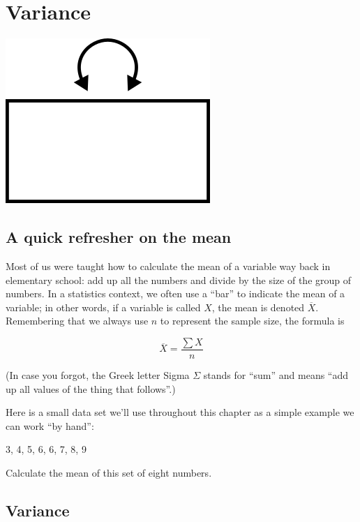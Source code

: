 \documentclass[
]{book}
\begin{document}
\hypertarget{variance}{%
\chapter{Variance}\label{variance}}

\begin{center}\includegraphics{graphics/variance} \end{center}

\hypertarget{variance-mean}{%
\section{A quick refresher on the mean}\label{variance-mean}}

Most of us were taught how to calculate the mean of a variable way back in elementary school: add up all the numbers and divide by the size of the group of numbers. In a statistics context, we often use a ``bar'' to indicate the mean of a variable; in other words, if a variable is called \(X\), the mean is denoted \(\overline{X}\). Remembering that we always use \(n\) to represent the sample size, the formula is

\[
\overline{X} = \frac{\sum{X}}{n}
\]

(In case you forgot, the Greek letter Sigma \(\Sigma\) stands for ``sum'' and means ``add up all values of the thing that follows''.)

Here is a small data set we'll use throughout this chapter as a simple example we can work ``by hand'':

3, 4, 5, 6, 6, 7, 8, 9

Calculate the mean of this set of eight numbers.

\hypertarget{variance-variance}{%
\section{Variance}\label{variance-variance}}
\end{document}
